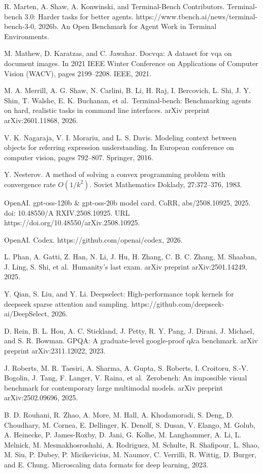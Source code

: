 \documentclass[
  10
]{article}
\begin{document}
R. Marten, A. Shaw, A. Konwinski, and Terminal-Bench Contributors.
Terminal-bench 3.0: Harder tasks for better agents.
https://www.tbench.ai/news/terminal-bench-3-0, 2026b. An Open Benchmark
for Agent Work in Terminal Environments.

M. Mathew, D. Karatzas, and C. Jawahar. Docvqa: A dataset for vqa on
document images. In 2021 IEEE Winter Conference on Applications of
Computer Vision (WACV), pages 2199--2208. IEEE, 2021.



M. A. Merrill, A. G. Shaw, N. Carlini, B. Li, H. Raj, I. Bercovich, L.
Shi, J. Y. Shin, T. Walshe, E. K. Buchanan, et al.~Terminal-bench:
Benchmarking agents on hard, realistic tasks in command line interfaces.
arXiv preprint arXiv:2601.11868, 2026.

V. K. Nagaraja, V. I. Morariu, and L. S. Davis. Modeling context between
objects for referring expression understanding. In European conference
on computer vision, pages 792--807. Springer, 2016.

Y. Nesterov. A method of solving a convex programming problem with
convergence rate $O(1/k^2)$. Soviet Mathematics Doklady, 27:372--376, 1983.

OpenAI. gpt-oss-120b \& gpt-oss-20b model card. CoRR, abs/2508.10925,
2025. doi: 10.48550/A RXIV.2508.10925. URL
https://doi.org/10.48550/arXiv.2508.10925.

OpenAI. Codex. https://github.com/openai/codex, 2026.

L. Phan, A. Gatti, Z. Han, N. Li, J. Hu, H. Zhang, C. B. C. Zhang, M.
Shaaban, J. Ling, S. Shi, et al.~Humanity's last exam. arXiv preprint
arXiv:2501.14249, 2025.

Y. Qian, S. Liu, and Y. Li. Deepselect: High-performance topk kernels
for deepseek sparse attention and sampling.
https://github.com/deepseek-ai/DeepSelect, 2026.

D. Rein, B. L. Hou, A. C. Stickland, J. Petty, R. Y. Pang, J. Dirani, J.
Michael, and S. R. Bowman. GPQA: A graduate-level google-proof q\&a
benchmark. arXiv preprint arXiv:2311.12022, 2023.

J. Roberts, M. R. Taesiri, A. Sharma, A. Gupta, S. Roberts, I. Croitoru,
S.-V. Bogolin, J. Tang, F. Langer, V. Raina, et al.~Zerobench: An
impossible visual benchmark for contemporary large multimodal models.
arXiv preprint arXiv:2502.09696, 2025.

B. D. Rouhani, R. Zhao, A. More, M. Hall, A. Khodamoradi, S. Deng, D.
Choudhary, M. Cornea, E. Dellinger, K. Denolf, S. Dusan, V. Elango, M.
Golub, A. Heinecke, P. James-Roxby, D. Jani, G. Kolhe, M. Langhammer, A.
Li, L. Melnick, M. Mesmakhosroshahi, A. Rodriguez, M. Schulte, R.
Shafipour, L. Shao, M. Siu, P. Dubey, P. Micikevicius, M. Naumov, C.
Verrilli, R. Wittig, D. Burger, and E. Chung. Microscaling data formats
for deep learning, 2023.
\end{document}
